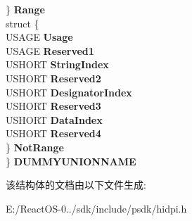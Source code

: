 \begin{DoxyCompactItemize}
\begin{tabbing}
\>\} {\bfseries Range}\\
\>struct \{\\
\>\>USAGE {\bfseries Usage}\\
\>\>USAGE {\bfseries Reserved1}\\
\>\>USHORT {\bfseries StringIndex}\\
\>\>USHORT {\bfseries Reserved2}\\
\>\>USHORT {\bfseries DesignatorIndex}\\
\>\>USHORT {\bfseries Reserved3}\\
\>\>USHORT {\bfseries DataIndex}\\
\>\>USHORT {\bfseries Reserved4}\\
\>\} {\bfseries NotRange}\\
\} {\bfseries DUMMYUNIONNAME}\\

\end{tabbing}\end{DoxyCompactItemize}


该结构体的文档由以下文件生成\+:\begin{DoxyCompactItemize}
\item 
E\+:/\+React\+O\+S-\/0../sdk/include/psdk/hidpi.\+h\end{DoxyCompactItemize}
